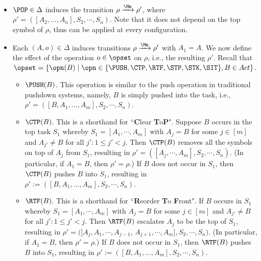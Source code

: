 \begin{itemize}
    \item $\POP \in \Delta$ induces the transition $\rho \xrightarrow{\Mm} \rho'$, where $\rho'=([A_2,\dots,A_n],S_2,\cdots,S_n)$.
Note that %
it does not depend on the top symbol of $\rho$, thus can be applied at every configuration.

\item Each $(A, o)\in \Delta$ induces transitions $\rho \xrightarrow{\Mm} \rho'$ with $A_1 = A$. We now define the effect of the operation $o\in \opset$ on $\rho$, i.e., the resulting $\rho'$. 
Recall that $\opset=\{\opn(B)\mid \opn \in \{\PUSH, \CTP, \RTF, \STP, \STK,\SIT\}, B \in Act \} $.
\begin{itemize}
    \item $\PUSH(B)$. This operation is similar to the push operation in traditional pushdown systems, namely, $B$ is simply pushed into the task, i.e., $\rho' = ([B, A_1,\dots, A_m],S_2,\cdots,S_n)$.
	
	\item $\CTP(B)$. This is a shorthand for ``\textbf{C}lear \textbf{T}o\textbf{P}". Suppose $B$ occurs in the top task $S_1$ whereby $S_1=[A_{1}, \cdots, A_{m}]$ with $A_{j} =B$ for some $j \in [m]$ and $A_{j'} \neq B$ for all $j': 1 \le j' < j$. Then $\CTP(B)$ removes all the symbols on top of $A_j$ from $S_1$, resulting in $\rho' = ([A_{j}, \cdots, A_{m}],S_2,\cdots,S_n)$. (In particular, if $A_1 = B$, then $\rho' = \rho$.)  If $B$ does not occur in $S_1$, then $\CTP(B)$ pushes $B$ into $S_1$, resulting in $\rho' := ([B, A_1,\dots, A_m],S_2,\cdots,S_n)$. 
	
	\item $\RTF(B)$. This is a shorthand for ``\textbf{R}eorder \textbf{T}o \textbf{F}ront". If $B$ occurs in $S_1$ whereby $S_1=[A_{1}, \cdots, A_{m}]$ with $A_{j} =B$ for some $j \in [m]$  and $A_{j'} \neq B$ for all $j': 1 \le j' < j$. Then $\RTF(B)$ escalates $A_{j}$ to be the top of $S_1$, resulting in  
	$\rho' = ([A_{j}, A_{1}, \cdots, A_{j-1}$, $A_{j+1}, \cdots, A_{m}],S_2,\cdots,S_n)$. (In particular, if $A_1 = B$, then $\rho' = \rho$.)
        If $B$ does not occur in $S_1$, then $\RTF(B)$ pushes $B$ into $S_1$, resulting in $\rho' := ([B, A_1,\dots, A_m],S_2,\cdots,S_n)$. 


\end{itemize}
\end{itemize}
